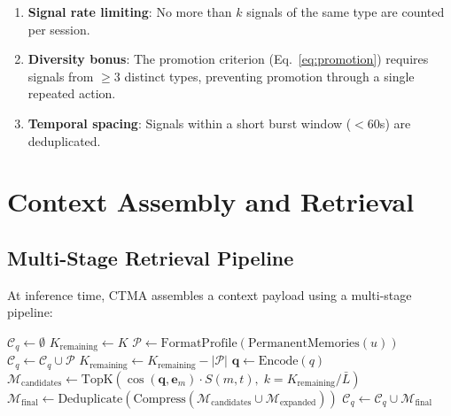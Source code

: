 \documentclass[11pt,a4paper]{article}
\begin{document}
\begin{enumerate}[label=(\roman*)]
  \item \textbf{Signal rate limiting}: No more than $k$ signals of the same type are counted per session.
  \item \textbf{Diversity bonus}: The promotion criterion (Eq.~\ref{eq:promotion}) requires signals from $\geq 3$ distinct types, preventing promotion through a single repeated action.
  \item \textbf{Temporal spacing}: Signals within a short burst window ($< 60$s) are deduplicated.
\end{enumerate}


\section{Context Assembly and Retrieval}
\label{sec:retrieval}

\subsection{Multi-Stage Retrieval Pipeline}

At inference time, CTMA assembles a context payload using a multi-stage pipeline:

\begin{algorithm}[H]
\SetAlgoLined
{}
$\mathcal{C}_q \leftarrow \emptyset$\;
$K_{\text{remaining}} \leftarrow K$\;
\BlankLine
{}
$\mathcal{P} \leftarrow \text{FormatProfile}(\text{PermanentMemories}(u))$\;
$\mathcal{C}_q \leftarrow \mathcal{C}_q \cup \mathcal{P}$\;
$K_{\text{remaining}} \leftarrow K_{\text{remaining}} - |\mathcal{P}|$\;
\BlankLine
{}
$\mathbf{q} \leftarrow \text{Encode}(q)$\;
\BlankLine
{}
$\mathcal{M}_{\text{candidates}} \leftarrow \text{TopK}(\cos(\mathbf{q}, \mathbf{e}_m) \cdot S(m, t), \; k = K_{\text{remaining}} / \bar{L})$\;
\BlankLine
{}
\BlankLine
{}
$\mathcal{M}_{\text{final}} \leftarrow \text{Deduplicate}(\text{Compress}(\mathcal{M}_{\text{candidates}} \cup \mathcal{M}_{\text{expanded}}))$\;
$\mathcal{C}_q \leftarrow \mathcal{C}_q \cup \mathcal{M}_{\text{final}}$\;
\BlankLine
{}
\caption{CTMA Context Assembly Pipeline}
\label{alg:retrieval}
\end{algorithm}
\end{document}
